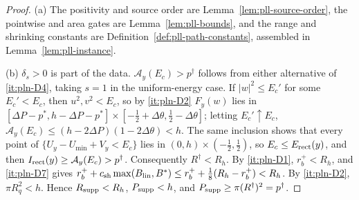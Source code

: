\begin{proof}
(a) The positivity and source order are
Lemma~\ref{lem:pll-source-order}, the pointwise and area gates are
Lemma~\ref{lem:pll-bounds}, and the range and shrinking constants are
Definition~\ref{def:pll-path-constants}, assembled in Lemma~\ref{lem:pll-instance}.

(b) $\delta_s>0$ is part of the data. $\mathcal A_y(E_c)>p^\dagger$ follows from either alternative of \ref{it:pln-D4}, taking $s=1$ in the uniform-energy case. If $|w|^2\le E_c'$ for
some $E_c'<E_c$, then $u^2,v^2<E_c$, so by \ref{it:pln-D2} $F_y(w)$ lies in
$[\Delta P-p^*,h-\Delta P-p^*]\times[-\frac12+\Delta\theta,\frac12-\Delta\theta]$; letting $E_c'\uparrow E_c$,
$\mathcal A_y(E_c)\le(h-2\Delta P)(1-2\Delta\theta)<h$. The same inclusion shows that every point of
$\{U_y-U_{\min}+V_y<E_c\}$ lies in $(0,h)\times(-\frac12,\frac12)$, so $E_c\le E_{\rm rect}(y)$, and then
$I_{\rm rect}(y)\ge\mathcal A_y(E_c)>p^\dagger$. Consequently $R^\dagger<R_h$. By \ref{it:pln-D1}, $r_b^+<R_h$, and
\ref{it:pln-D7} gives $r_b^++c_{\rm sh}\max(B_{\rm lin},B^*)\le r_b^++\frac18(R_h-r_b^+)<R_h$. By \ref{it:pln-D2}, $\pi R_q^2<h$.
Hence $R_{\rm supp}<R_h$, $P_{\rm supp}<h$, and $P_{\rm supp}\ge\pi(R^\dagger)^2=p^\dagger$.
\end{proof}

